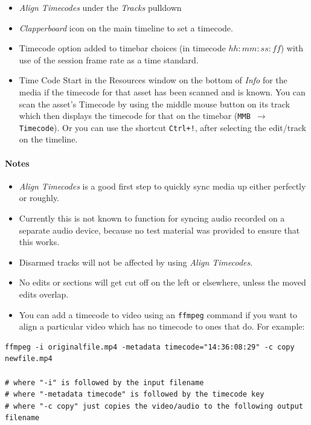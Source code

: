 \begin{itemize}
	\item \textit{Align Timecodes} under the \textit{Tracks} pulldown
	\item \textit{Clapperboard} icon on the main timeline to set a timecode.
	\item Timecode option added to timebar choices (in timecode $hh:mm:ss:ff$) with use of the session frame
	rate as a time standard.
	\item Time Code Start in the Resources window on the bottom of \textit{Info} for the media if the timecode for that
	asset has been scanned and is known. You can scan the asset’s Timecode by using the middle mouse
	button on its track which then displays the timecode for that on the timebar (\texttt{MMB $\rightarrow$ Timecode}). Or you can use the shortcut \texttt{Ctrl+!}, after selecting the edit/track on the timeline.
\end{itemize}

\paragraph*{Notes}

\begin{itemize}
	\item \textit{Align Timecodes} is a good first step to quickly sync media up either perfectly or roughly.
	\item Currently this is not known to function for syncing audio recorded on a separate audio device,
	because no test material was provided to ensure that this works.
	\item Disarmed tracks will not be affected by using \textit{Align Timecodes}.
	\item No edits or sections will get cut off on the left or elsewhere, unless the moved edits overlap.
	\item You can add a timecode to video using an \texttt{ffmpeg} command if you want to align a particular video
	which has no timecode to ones that do. For example:
\end{itemize}

\begin{lstlisting}[style=sh]
ffmpeg -i originalfile.mp4 -metadata timecode="14:36:08:29" -c copy newfile.mp4

# where "-i" is followed by the input filename
# where "-metadata timecode" is followed by the timecode key
# where "-c copy" just copies the video/audio to the following output filename
\end{lstlisting}

